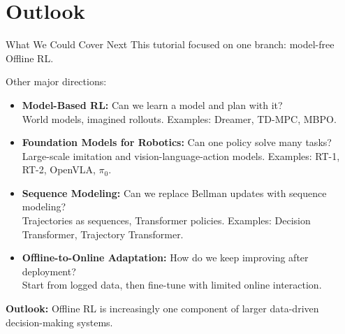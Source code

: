 \section{Outlook}

\begin{frame}{What We Could Cover Next}
  This tutorial focused on one branch: model-free Offline RL.

  \vspace{0.25cm}
  Other major directions:
  \begin{itemize}
    \item \textbf{Model-Based RL:} Can we learn a model and plan with it? \\
    World models, imagined rollouts. Examples: Dreamer, TD-MPC, MBPO.

    \vspace{0.16cm}
    \item \textbf{Foundation Models for Robotics:} Can one policy solve many tasks? \\
    Large-scale imitation and vision-language-action models. Examples: RT-1, RT-2, OpenVLA, $\pi_0$.

    \vspace{0.16cm}
    \item \textbf{Sequence Modeling:} Can we replace Bellman updates with sequence modeling? \\
    Trajectories as sequences, Transformer policies. Examples: Decision Transformer, Trajectory Transformer.

    \vspace{0.16cm}
    \item \textbf{Offline-to-Online Adaptation:} How do we keep improving after deployment? \\
    Start from logged data, then fine-tune with limited online interaction.
  \end{itemize}

  \vspace{0.15cm}
  \textbf{Outlook:} Offline RL is increasingly one component of larger data-driven decision-making systems.
\end{frame}
